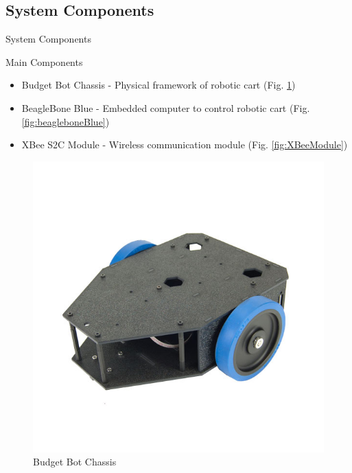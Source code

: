 \documentclass{beamer}
\begin{document}
\subsection{System Components}
\begin{frame}{System Components}
  \begin{block}{Main Components}
    \begin{itemize}
      \item Budget Bot Chassis - Physical framework of robotic cart (Fig. \ref{fig:budgetBotChassis})
      \item BeagleBone Blue - Embedded computer to control robotic cart (Fig. \ref{fig:beagleboneBlue})
      \item XBee S2C Module - Wireless communication module (Fig. \ref{fig:XBeeModule})
    \end{itemize}
  \end{block}
  \begin{figure}
    \centering
    \begin{minipage}[t]{0.32\textwidth}
      \includegraphics[width=1\textwidth]{figs/img/budgetbot_chassis}
      \caption{Budget Bot Chassis}
      \label{fig:budgetBotChassis}
    \end{minipage}%
    \begin{minipage}[t]{0.32\textwidth}

\end{minipage}
\end{figure}
\end{frame}
\end{document}
